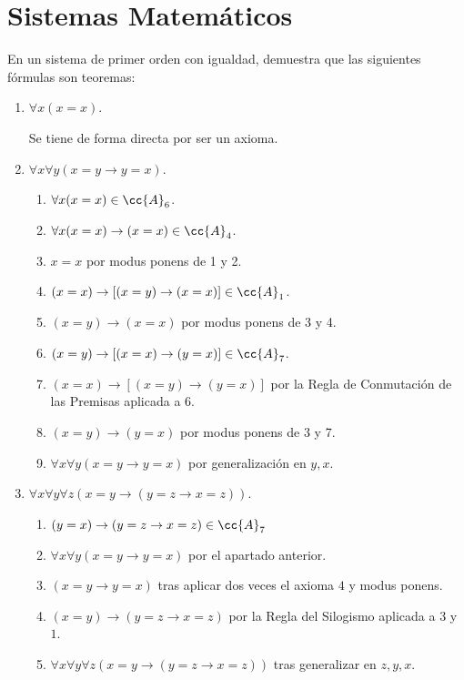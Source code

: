 \section{Sistemas Matemáticos}

\begin{ejercicio}
    En un sistema de primer orden con igualdad, demuestra que las siguientes fórmulas son teoremas:
    \begin{enumerate}
        \item $\forall x (x = x)$.
        
        Se tiene de forma directa por ser un axioma.
        \item $\forall x \forall y (x = y \rightarrow y = x)$.
        \begin{enumerate}[label=\arabic*.]
            \item $\forall x(x=x)\in \cc{A}_6$.
            \item $\forall x(x=x)\to (x=x)\in \cc{A}_4$.
            \item $x=x$ por modus ponens de 1 y 2.
            \item $(x=x)\to [(x=y)\to (x=x)]\in \cc{A}_1$.
            \item $(x=y)\to (x=x)$ por modus ponens de 3 y 4.
            \item $(x=y)\to [(x=x)\to (y=x)]\in \cc{A}_7$.
            \item $(x=x)\to [(x=y)\to (y=x)]$ por la Regla de Conmutación de las Premisas aplicada a 6.
            \item $(x=y)\to (y=x)$ por modus ponens de 3 y 7.
            \item $\forall x\forall y (x=y\to y=x)$ por generalización en $y,x$.
        \end{enumerate}
        
        \item $\forall x \forall y \forall z (x = y \rightarrow (y = z \rightarrow x = z))$.
        \begin{enumerate}[label=\arabic*.]
            \item $(y = x) \rightarrow (y = z \rightarrow x = z)\in \cc{A}_7$
            \item $\forall x\forall y (x=y\to y=x)$ por el apartado anterior.
            \item $(x=y\to y=x)$ tras aplicar dos veces el axioma $4$ y modus ponens.
            \item $(x = y) \rightarrow (y = z \rightarrow x = z)$ por la Regla del Silogismo aplicada a $3$ y $1$.
            \item $\forall x \forall y \forall z (x = y \rightarrow (y = z \rightarrow x = z))$ tras generalizar en $z,y,x$.
        \end{enumerate}
    \end{enumerate}
\end{ejercicio}


